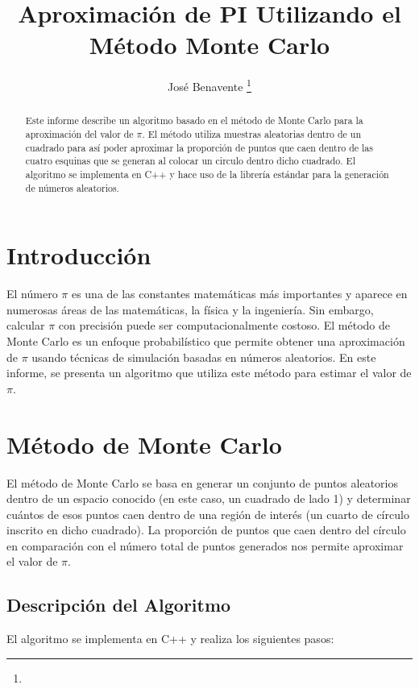 \documentclass[a4paper, 10pt]{IEEEtran}
\begin{document}
\title{Aproximación de PI Utilizando el Método Monte Carlo}
\author{José Benavente
\thanks{}}
\maketitle

\maketitle

\begin{abstract}
Este informe describe un algoritmo basado en el método de Monte Carlo para la aproximación del valor de $\pi$. El método utiliza muestras aleatorias dentro de un cuadrado para así poder aproximar la proporción de puntos que caen dentro de las cuatro esquinas que se generan al colocar un circulo dentro dicho cuadrado. El algoritmo se implementa en C++ y hace uso de la librería estándar para la generación de números aleatorios.
\end{abstract}

\section{Introducción}
El número $\pi$ es una de las constantes matemáticas más importantes y aparece en numerosas áreas de las matemáticas, la física y la ingeniería. Sin embargo, calcular $\pi$ con precisión puede ser computacionalmente costoso. El método de Monte Carlo es un enfoque probabilístico que permite obtener una aproximación de $\pi$ usando técnicas de simulación basadas en números aleatorios. En este informe, se presenta un algoritmo que utiliza este método para estimar el valor de $\pi$.

\section{Método de Monte Carlo}
El método de Monte Carlo se basa en generar un conjunto de puntos aleatorios dentro de un espacio conocido (en este caso, un cuadrado de lado 1) y determinar cuántos de esos puntos caen dentro de una región de interés (un cuarto de círculo inscrito en dicho cuadrado). La proporción de puntos que caen dentro del círculo en comparación con el número total de puntos generados nos permite aproximar el valor de $\pi$.

\subsection{Descripción del Algoritmo}
El algoritmo se implementa en C++ y realiza los siguientes pasos:
\end{document}
